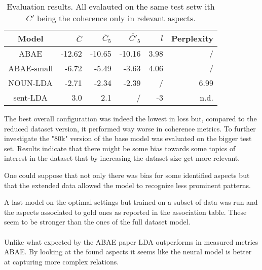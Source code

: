 \begin{center}
    \begin{table}
        \begin{tabular}{c r r r r r}
            \hline
            Model      & $\overline{C}$ & $\overline{C}_5$ & $\overline{C'}_5$ & $l$  & Perplexity\\ [0.5ex]
            \hline
            ABAE       & -12.62         & -10.65           & -10.16            & 3.98 & /          \\
            \hline
            ABAE-small & -6.72          & -5.49            & -3.63             & 4.06 & /          \\
            \hline %
            NOUN-LDA   & -2.71          & -2.34            & -2.39             & /    & 6.99       \\
            \hline  %
            sent-LDA   & 3.0            & 2.1              & /                 & -3   & n.d.       \\
            \hline
        \end{tabular}
        \caption{Evaluation results. All evalauted on the same test setw ith $C'$ being the coherence only in relevant aspects.
        }
        \label{performance-review}

    \end{table}

\end{center}

The best overall configuration was indeed the lowest in loss but, compared to the reduced
dataset version, it performed way worse in coherence metrics.
To further investigate the "80k" version of the base model was evaluated on the bigger test set.
Results indicate that there might be some bias towards some topics of interest in the dataset
that by increasing the dataset size get more relevant.

One could suppose that not only there was bias for some identified aspects but that the extended
data allowed the model to recognize less prominent patterns.

A last model on the optimal settings but trained on a subset of data was run and the aspects
associated to gold ones as reported in the association table.
These seem to be stronger than the ones of the full dataset model.

\paragraph{}
Unlike what expected by the ABAE paper LDA outperforms in measured metrics ABAE.
By looking at the found aspects it seems like the neural model is better at capturing more complex relations.


